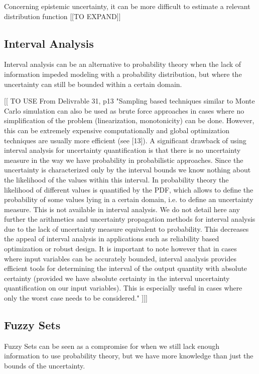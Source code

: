 Concerning epistemic uncertainty, it can be more difficult to estimate a relevant distribution function  [[TO EXPAND]]

\subsection{Interval Analysis}

Interval analysis can be an alternative to probability theory when the lack of information impeded modeling with a probability distribution, but where the uncertainty can still be bounded within a certain domain.

[[ TO USE From Delivrable 31, p13      
      "Sampling based techniques similar to Monte Carlo simulation can also be used as brute
force approaches in cases where no simplification of the problem (linearization, monotonicity)
can be done. However, this can be extremely expensive computationally and global
optimization techniques are usually more efficient (see [13]).
       A significant drawback of using interval analysis for uncertainty quantification is that
there is no uncertainty measure in the way we have probability in probabilistic approaches.
Since the uncertainty is characterized only by the interval bounds we know nothing about the
likelihood of the values within this interval. In probability theory the likelihood of different
values is quantified by the PDF, which allows to define the probability of some values lying
in a certain domain, i.e. to define an uncertainty measure. This is not available in interval
analysis.
      We do not detail here any further the arithmetics and uncertainty propagation methods
for interval analysis due to the lack of uncertainty measure equivalent to probability. This
decreases the appeal of interval analysis in applications such as reliability based optimization
or robust design. It is important to note however that in cases where input variables can be
accurately bounded, interval analysis provides efficient tools for determining the interval of
the output quantity with absolute certainty (provided we have absolute certainty in the interval
uncertainty quantification on our input variables). This is especially useful in cases where
only the worst case needs to be considered."
]]]

\subsection{Fuzzy Sets}
Fuzzy Sets can be seen as a compromise for when we still lack enough information to use probability theory, but we have more knowledge than just the bounds of the uncertainty.

